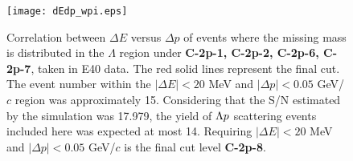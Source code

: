\begin{figure}[!h]
  \begin{center}
    \texttt{[image: dEdp\_wpi.eps]}
    \caption{Correlation between $\Delta E$ versus $\Delta p$ of events where the missing mass is distributed in the $\Lambda$ region under {\bf C-2p-1, C-2p-2, C-2p-6, C-2p-7}, taken in E40 data. The red solid lines represent the final cut. The event number within the $|\Delta E|<20$ MeV and $|\Delta p|<0.05$ GeV/$c$ region was approximately 15. Considering that the S/N estimated by the simulation was 17.979, the yield of $\Lambda p$ scattering events included here was expected at most 14. Requiring $|\Delta E|<20$ MeV and $|\Delta p|<0.05$ GeV/$c$ is the final cut level {\bf C-2p-8}.}
    \label{fig-dEdp_wpi}
  \end{center}
\end{figure}


